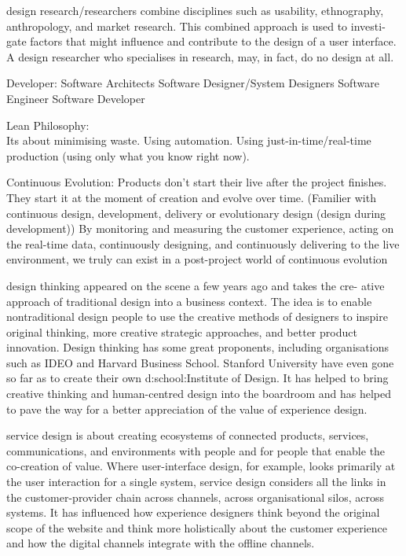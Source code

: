 design research/researchers combine disciplines such as usability, ethnography, anthropology, and market research. This combined approach is used to investi- gate factors that might influence and contribute to the design of a user interface. A design researcher who specialises in research, may, in fact, do no design at all.

Developer:
Software Architects
Software Designer/System Designers
Software Engineer
Software Developer

Lean Philosophy:\\
Its about minimising waste. Using automation. Using just-in-time/real-time production (using only what you know right now).

Continuous Evolution: 
Products don't start their live after the project finishes.\\
They start it at the moment of creation and evolve over time.
(Familier with continuous design, development, delivery or evolutionary design (design during development))
By monitoring and measuring the customer experience, acting on the real-time data, continuously designing, and continuously delivering to the live environment, we truly can exist in a post-project world of continuous evolution

design thinking appeared on the scene a few years ago and takes the cre- ative approach of traditional design into a business context. The idea is to enable nontraditional design people to use the creative methods of designers to inspire original thinking, more creative strategic approaches, and better product innovation. Design thinking has some great proponents, including organisations such as IDEO and Harvard Business School. Stanford University have even gone so far as to create their own d:school:Institute of Design.
It has helped to bring creative thinking and human-centred design into the boardroom and has helped to pave the way for a better appreciation of the value of experience design.

service design is about creating ecosystems of connected products, services, communications, and environments with people and for people that enable the co-creation of value. Where user-interface design, for example, looks primarily at the user interaction for a single system, service design considers all the links in the customer-provider chain across channels, across organisational silos, across systems. It has influenced how experience designers think beyond the original scope of the website and think more holistically about the customer experience and how the digital channels integrate with the offline channels.

